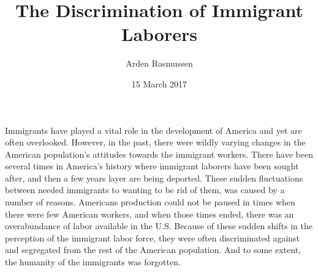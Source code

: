 \documentclass[12pt, twoside]{article}
\title{The Discrimination of Immigrant Laborers}
\author{Arden Rasmussen}
\date{15 March 2017}
\begin{document}
\maketitle
\newpage
{}
\par
Immigrants have played a vital role in the development of America and yet are often overlooked. However, in the past, there were wildly varying changes in the American population's attitudes towards the immigrant workers. There have been several times in America's history where immigrant laborers have been sought after, and then a few years layer are being deported. These sudden fluctuations between needed immigrants to wanting to be rid of them, was caused by a number of reasons. Americans production could not be paused in times when there were few American workers, and when those times ended, there was an overabundance of labor available in the U.S. Because of these sudden shifts in the perception of the immigrant labor force, they were often discriminated against and segregated from the rest of the American population. And to some extent, the humanity of the immigrants was forgotten.
\par
\end{document}
